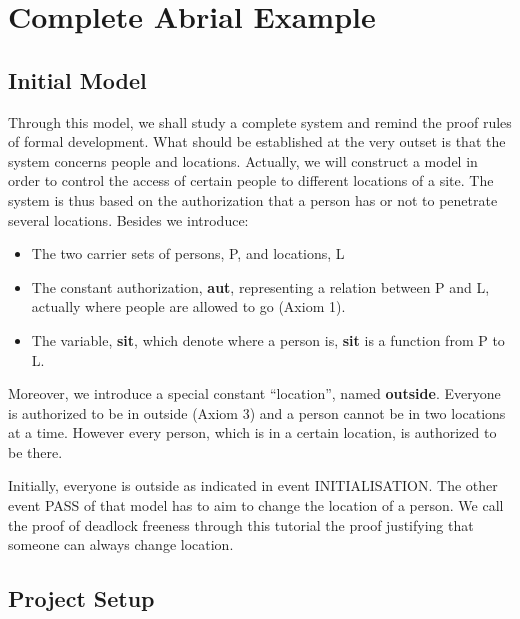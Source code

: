 \section{Complete Abrial Example}
\label{tutorial_10}



\subsection{Initial Model}

Through this model, we shall study a complete system and remind the proof rules of formal development.
What should be established at the very outset is that the system concerns people and locations. Actually, we will construct a model in order to control the access of certain people to different locations of a site.
The system is thus based on the authorization that a person has or not to penetrate several locations.
Besides we introduce:

\begin{itemize}
	\item The two carrier sets of persons, P, and locations, L
	\item The constant authorization, \textbf{aut}, representing a relation between P and L, actually where people are allowed to go (Axiom 1).
	\item The variable, \textbf{sit}, which denote where a person is, \textbf{sit} is a function from P to L.
\end{itemize} 
 
Moreover, we introduce a special constant “location”, named \textbf{outside}. Everyone is authorized to be in outside (Axiom 3) and a person cannot be in two locations at a time. However every person, which is in a certain location, is authorized to be there.

Initially, everyone is outside as indicated in event \textsf{INITIALISATION}.
The other event \textsf{PASS} of that model has to aim to change the location of a person.
We call the proof of deadlock freeness through this tutorial the proof justifying that someone can always change location.

\subsection{Project Setup}

